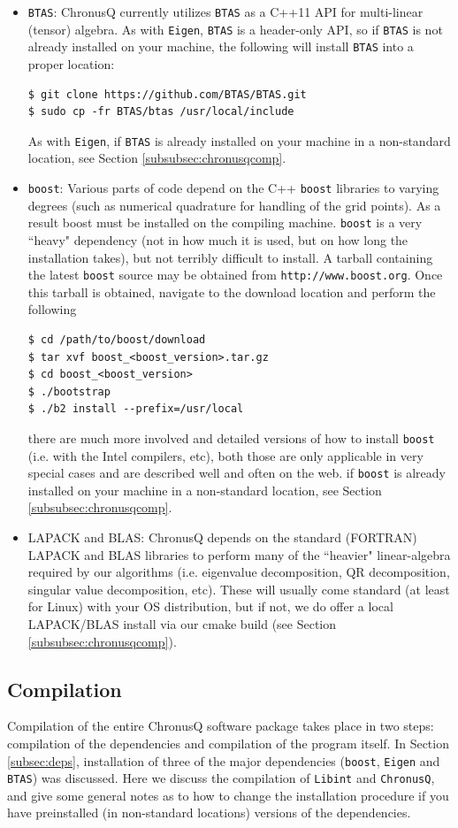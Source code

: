 \documentclass[12pt]{article}
\begin{document}
\begin{itemize}
\item \texttt{BTAS}: ChronusQ currently utilizes \texttt{BTAS} as a C++11 API for multi-linear (tensor) algebra. As with \texttt{Eigen}, \texttt{BTAS} is a header-only API, so if \texttt{BTAS} is not already installed on your machine, the following will install \texttt{BTAS} into a proper location:
\begin{lstlisting}
$ git clone https://github.com/BTAS/BTAS.git
$ sudo cp -fr BTAS/btas /usr/local/include
\end{lstlisting}
As with \texttt{Eigen}, if \texttt{BTAS} is already installed on your machine in a non-standard location, see Section \ref{subsubsec:chronusqcomp}.

\item \texttt{boost}: Various parts of code depend on the C++ \texttt{boost} libraries to varying degrees (such as numerical quadrature for handling of the grid points). As a result boost must be installed on the compiling machine. \texttt{boost} is a very ``heavy" dependency (not in how much it is used, but on how long the installation takes), but not terribly difficult to install. A tarball containing the latest \texttt{boost} source may be obtained from \texttt{http://www.boost.org}. Once this tarball is obtained, navigate to the download location and perform the following
\begin{lstlisting}
$ cd /path/to/boost/download
$ tar xvf boost_<boost_version>.tar.gz
$ cd boost_<boost_version>
$ ./bootstrap
$ ./b2 install --prefix=/usr/local
\end{lstlisting}
there are much more involved and detailed versions of how to install \texttt{boost} (i.e. with the Intel compilers, etc), both those are only applicable in very special cases and are described well and often on the web.  if \texttt{boost} is already installed on your machine in a non-standard location, see Section \ref{subsubsec:chronusqcomp}.

\item LAPACK and BLAS: ChronusQ depends on the standard (FORTRAN) LAPACK and BLAS libraries to perform many of the ``heavier" linear-algebra required by our algorithms (i.e. eigenvalue decomposition, QR decomposition, singular value decomposition, etc). These will usually come standard (at least for Linux) with your OS distribution, but if not, we do offer a local LAPACK/BLAS install via our cmake build (see Section \ref{subsubsec:chronusqcomp}).
\end{itemize}

\subsection{Compilation}
Compilation of the entire ChronusQ software package takes place in two steps: compilation of the dependencies and compilation of the program itself. In Section \ref{subsec:deps}, installation of three of the major dependencies (\texttt{boost}, \texttt{Eigen} and \texttt{BTAS}) was discussed. Here we discuss the compilation of \texttt{Libint} and \texttt{ChronusQ}, and give some general notes as to how to change the installation procedure if you have preinstalled (in non-standard locations) versions of the dependencies.
\end{document}
